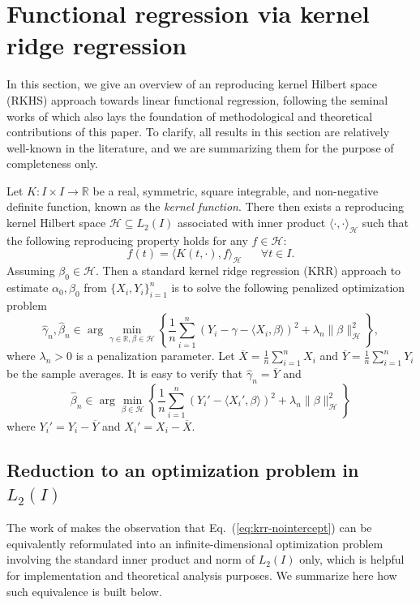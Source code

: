 \documentclass[11pt,a4paper]{article}
\renewcommand{\hat}{\widehat}
\renewcommand{\bar}{\overline}
\theoremstyle{definition}
\theoremstyle{plain}
\theoremstyle{remark}
\newcommand{\mH}{\mathcal H}
\begin{document}
\section{Functional regression via kernel ridge regression}

In this section, we give an overview of an reproducing kernel Hilbert space (RKHS) approach towards linear functional regression, following the seminal works of \cite{cai2012minimax} which also lays the foundation of 
methodological and theoretical contributions of this paper.
To clarify, all results in this section are relatively well-known in the literature, and we are summarizing them for the purpose of completeness only.

Let $K:I\times I\to\mathbb R$ be a real, symmetric, square integrable, and non-negative definite function, known as the \emph{kernel function}.
There then exists a reproducing kernel Hilbert space $\mH\subseteq L_2(I)$ associated with inner product $\langle\cdot,\cdot\rangle_{\mH}$
such that the following reproducing property holds for any $f\in\mH$:
$$
f(t) = \langle K(t,\cdot), f\rangle_{\mH}\;\;\;\;\;\;\forall t\in I.
$$
Assuming $\beta_0\in\mH$. Then a standard kernel ridge regression (KRR) approach to estimate $\alpha_0,\beta_0$ from $\{X_i,Y_i\}_{i=1}^n$ is to solve the following penalized optimization problem
\begin{equation}
\hat\gamma_n,\hat\beta_n \in \arg\min_{\gamma\in\mathbb R,\beta\in\mH} \left\{\frac{1}{n}\sum_{i=1}^n (Y_i-\gamma-\langle X_i,\beta\rangle)^2 + \lambda_n \|\beta\|_\mH^2\right\},
\label{eq:krr}
\end{equation}
where $\lambda_n>0$ is a penalization parameter.
Let $\bar X=\frac{1}{n}\sum_{i=1}^n X_i$ and $\bar Y=\frac{1}{n}\sum_{i=1}^n Y_i$ be the sample averages. It is easy to verify that $\hat\gamma_n=\bar Y$ and 
\begin{equation}
\hat\beta_n\in\arg\min_{\beta\in\mH}\left\{\frac{1}{n}\sum_{i=1}^n (Y_i'-\langle X_i',\beta\rangle)^2 + \lambda_n\|\beta\|_\mH^2\right\}
\label{eq:krr-nointercept}
\end{equation}
where $Y_i'=Y_i-\bar Y$ and $X_i'=X_i-\bar X$.

\subsection{Reduction to an optimization problem in $L_2(I)$}

The work of \cite{cai2012minimax} makes the observation that Eq.~(\ref{eq:krr-nointercept}) can be equivalently reformulated into an infinite-dimensional optimization problem
involving the standard inner product and norm of $L_2(I)$ only, which is helpful for implementation and theoretical analysis purposes.
We summarize here how such equivalence is built below.
\end{document}
